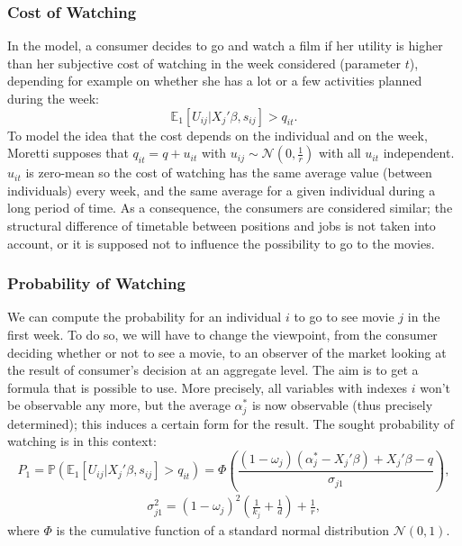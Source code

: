 	\subsubsection{Cost of Watching}
	In the model, a consumer decides to go and watch a film if her utility is higher than her subjective cost of watching in the week considered (parameter $t$), depending for example on whether she has a lot or a few activities planned during the week: 
	\begin{equation}
	\mathbb{E}_1[U_{i j}|X_{j}'\beta, s_{i j}]>q_{i t}.
	\end{equation}
	To model the idea that the cost depends on the individual and on the week, Moretti supposes that $q_{i t}=q+u_{i t}$ with $u_{i j}\sim \mathcal{N}(0,\frac{1}{r})$ with all $u_{i t}$ independent. $u_{i t}$ is zero-mean so the cost of watching has the same average value (between individuals) every week, and the same average for a given individual during a long period of time. As a consequence, the consumers are considered similar; the structural difference of timetable between positions and jobs is not taken into account, or it is supposed not to influence the possibility to go to the movies.
	
	\subsubsection{Probability of Watching}
	We can compute the probability for an individual $i$ to go to see movie $j$ in the first week. To do so, we will have to change the viewpoint, from the consumer deciding whether or not to see a movie, to an observer of the market looking at the result of consumer's decision at an aggregate level. The aim is to get a formula that is possible to use. More precisely, all variables with indexes $i$ won't be observable any more, but the average $\alpha_{j}^{*}$ is now observable (thus precisely determined); this induces a certain form for the result. The sought probability of watching is in this context:
	\begin{equation} \label{eq:4}
	P_{1}=\mathbb{P}(\mathbb{E}_1[U_{i j}|X_{j}'\beta, s_{i j}]>q_{i t})=\Phi\left(\frac{(1-\omega_{j})(\alpha_{j}^{*}-X_{j}'\beta)+X_{j}'\beta-q}{\sigma_{j 1}}\right),
	\end{equation}
	\begin{align*}
	\sigma_{j 1}^{2}=(1-\omega_{j})^{2}\left(\frac{1}{k_{j}}+\frac{1}{d}\right)+\frac{1}{r},
	\end{align*}
	where $\Phi$ is the cumulative function of a standard normal distribution $\mathcal{N}(0,1)$.

